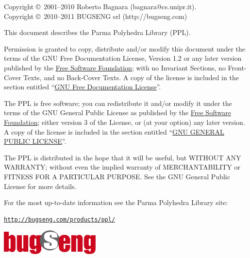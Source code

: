 \documentclass[a4paper,twoside]{article}
\begin{document}
\newpage
Copyright \copyright\ 2001--2010 Roberto Bagnara (bagnara@cs.unipr.it).\\
Copyright \copyright\ 2010--2011 BUGSENG srl (http://bugseng.com)


This document describes the Parma Polyhedra Library (PPL).

Permission is granted to copy, distribute and/or modify this document
under the terms of the GNU Free Documentation License, Version 1.2
or any later version published by the
\href{http://www.fsf.org}{Free Software Foundation};
with no Invariant Sections, no Front-Cover Texts, and no Back-Cover Texts.
A copy of the license is included in the section entitled
``\hyperlink{GFDL_GFDL}{GNU Free Documentation License}''.

The PPL is free software; you can redistribute it and/or modify it
under the terms of the GNU General Public License as published by the
\href{http://www.fsf.org}{Free Software Foundation}; either version 3
of the License, or (at your option) any later version.
A copy of the license is included in the section entitled
``\hyperlink{GPL_GPL}{GNU GENERAL PUBLIC LICENSE}''.

The PPL is distributed in the hope that it will be useful, but WITHOUT
ANY WARRANTY; without even the implied warranty of MERCHANTABILITY or
FITNESS FOR A PARTICULAR PURPOSE.  See the GNU General Public License
for more details.

For the most up-to-date information see the Parma Polyhedra Library
site:
\begin{center}
\href{http://bugseng.com/products/ppl/}{\tt http://bugseng.com/products/ppl/}
\end{center}
\vfill
\begin{center}
\includegraphics[width=5cm]{bugseng_logo.pdf}
\end{center}
\vfill
\clearpage{\pagestyle{empty}\cleardoublepage}


\addtolength{\cftsubsecnumwidth}{1em}

\tableofcontents
\clearpage{\pagestyle{empty}\cleardoublepage}

\end{document}
